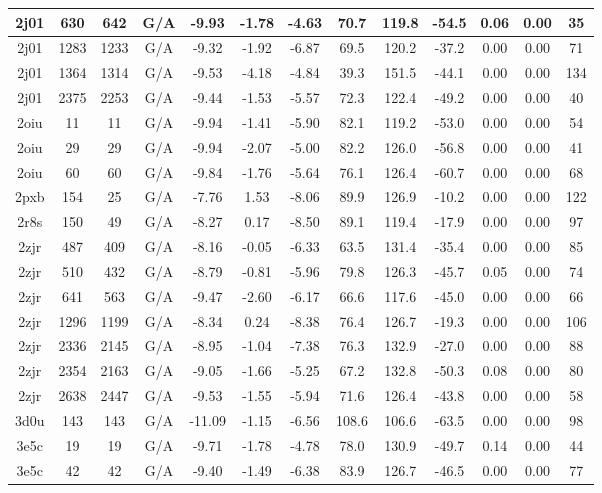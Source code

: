 {\begin{center}
\begin{longtable}{|c|c|c|c|c|c|c|c|c|c|c|c|c|}
2j01 & 630 & 642 & G/A & -9.93 & -1.78 & -4.63 & 70.7 & 119.8 & -54.5 & 0.06 & 0.00 & 35 \\ \hline
2j01 & 1283 & 1233 & G/A & -9.32 & -1.92 & -6.87 & 69.5 & 120.2 & -37.2 & 0.00 & 0.00 & 71 \\ \hline
2j01 & 1364 & 1314 & G/A & -9.53 & -4.18 & -4.84 & 39.3 & 151.5 & -44.1 & 0.00 & 0.00 & 134 \\ \hline
2j01 & 2375 & 2253 & G/A & -9.44 & -1.53 & -5.57 & 72.3 & 122.4 & -49.2 & 0.00 & 0.00 & 40 \\ \hline
2oiu & 11 & 11 & G/A & -9.94 & -1.41 & -5.90 & 82.1 & 119.2 & -53.0 & 0.00 & 0.00 & 54 \\ \hline
2oiu & 29 & 29 & G/A & -9.94 & -2.07 & -5.00 & 82.2 & 126.0 & -56.8 & 0.00 & 0.00 & 41 \\ \hline
2oiu & 60 & 60 & G/A & -9.84 & -1.76 & -5.64 & 76.1 & 126.4 & -60.7 & 0.00 & 0.00 & 68 \\ \hline
2pxb & 154 & 25 & G/A & -7.76 & 1.53 & -8.06 & 89.9 & 126.9 & -10.2 & 0.00 & 0.00 & 122 \\ \hline
2r8s & 150 & 49 & G/A & -8.27 & 0.17 & -8.50 & 89.1 & 119.4 & -17.9 & 0.00 & 0.00 & 97 \\ \hline
2zjr & 487 & 409 & G/A & -8.16 & -0.05 & -6.33 & 63.5 & 131.4 & -35.4 & 0.00 & 0.00 & 85 \\ \hline
2zjr & 510 & 432 & G/A & -8.79 & -0.81 & -5.96 & 79.8 & 126.3 & -45.7 & 0.05 & 0.00 & 74 \\ \hline
2zjr & 641 & 563 & G/A & -9.47 & -2.60 & -6.17 & 66.6 & 117.6 & -45.0 & 0.00 & 0.00 & 66 \\ \hline
2zjr & 1296 & 1199 & G/A & -8.34 & 0.24 & -8.38 & 76.4 & 126.7 & -19.3 & 0.00 & 0.00 & 106 \\ \hline
2zjr & 2336 & 2145 & G/A & -8.95 & -1.04 & -7.38 & 76.3 & 132.9 & -27.0 & 0.00 & 0.00 & 88 \\ \hline
2zjr & 2354 & 2163 & G/A & -9.05 & -1.66 & -5.25 & 67.2 & 132.8 & -50.3 & 0.08 & 0.00 & 80 \\ \hline
2zjr & 2638 & 2447 & G/A & -9.53 & -1.55 & -5.94 & 71.6 & 126.4 & -43.8 & 0.00 & 0.00 & 58 \\ \hline
3d0u & 143 & 143 & G/A & -11.09 & -1.15 & -6.56 & 108.6 & 106.6 & -63.5 & 0.00 & 0.00 & 98 \\ \hline
3e5c & 19 & 19 & G/A & -9.71 & -1.78 & -4.78 & 78.0 & 130.9 & -49.7 & 0.14 & 0.00 & 44 \\ \hline
3e5c & 42 & 42 & G/A & -9.40 & -1.49 & -6.38 & 83.9 & 126.7 & -46.5 & 0.00 & 0.00 & 77 \\ \hline

\end{longtable}
\end{center}}
